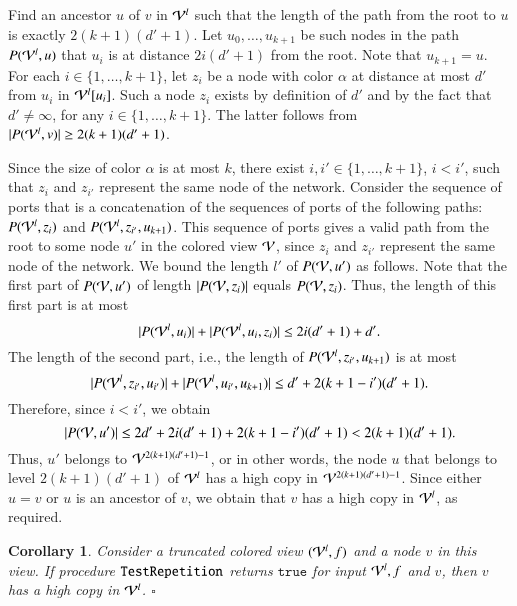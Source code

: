 \documentclass[a4paper,10pt]{article}
\newtheorem{corollary}{Corollary}[section]
\newcommand{\view}[1][]{\if!#1!\mathcal{V}\else\mathcal{V}^{#1}\fi}
\newcommand{\viewPath}[3][]{\if!#1! P(#2,#3)\else P(#2,#1,#3)\fi}  \newcommand{\ourColor}{\alpha}
\newcommand{\card}[1]{|#1|}
\newcommand{\algorithmTest}{\textup{\texttt{TestRepetition}}}
\newcommand{\returnTrue}{\texttt{true}}
\newcommand{\qed}{\hfill $\square$ \smallbreak}
\newenvironment{proof}[1][Proof]
{\par\noindent{\bf #1:} }{\hspace*{\fill}\nolinebreak{$\Box$}\bigskip\par}
\begin{document}
\begin{proof}
Find an ancestor $u$ of $v$ in $\view[l]$ such that the length of the path from the root to $u$ is exactly $2(k+1)(d'+1)$.
Let $u_0,\ldots,u_{k+1}$ be such nodes in the path $\viewPath{\view[l]}{u}$ that $u_i$ is at distance $2i(d'+1)$ from the root.
Note that $u_{k+1}=u$.
For each $i\in\{1,\ldots,k+1\}$, let $z_i$ be a node with color $\ourColor$ at distance at most $d'$ from $u_i$ in $\view[l][u_i]$.
Such a node $z_i$ exists by definition of $d'$ and by the fact that $d'\neq\infty$, {for any} $i\in\{1,\ldots,k+1\}$.
The latter follows from $\card{\viewPath{\view[l]}{v}} \geq 2(k+1)(d'+1)$.

Since the size of color $\ourColor$ is at most $k$, there exist $i,i'\in\{1,\ldots,k+1\}$, $i<i'$, such that $z_i$ and $z_{i'}$ represent the same node of the network.
Consider the sequence of ports that is a concatenation of the sequences of ports of the following paths: $\viewPath{\view[l]}{z_i}$ and $\viewPath[z_{i'}]{\view[l]}{u_{k+1}}$.
This sequence of ports gives a valid path from the root to some node $u'$ in the colored view $\view$, since $z_i$ and $z_{i'}$ represent the same node of the network.
We bound the length $l'$ of $\viewPath{\view}{u'}$ as follows.
Note that the first part of $\viewPath{\view}{u'}$ of length $|\viewPath{\view}{z_i}|$ equals $\viewPath{\view}{z_i}$.
Thus, the length of this first part is at most
\[|\viewPath{\view[l]}{u_i}|+|\viewPath[u_i]{\view[l]}{z_i}| \leq 2i(d'+1) + d'.\]
The length of the second part, i.e., the length of $\viewPath[z_{i'}]{\view[l]}{u_{k+1}}$ is {at most}
\[|\viewPath[z_{i'}]{\view[l]}{u_{i'}}|+|\viewPath[u_{i'}]{\view[l]}{u_{k+1}}| \leq d' + 2(k+1-i')(d'+1).\]
Therefore, since $i<i'$, we obtain
\[|\viewPath{\view}{u'}|\leq 2d'+2i(d'+1)+2(k+1-i')(d'+1)<2(k+1)(d'+1).\]
Thus, $u'$ belongs to $\view[2(k+1)(d'+1)-1]$, or in other words, the node $u$ that belongs to level $2(k+1)(d'+1)$ of $\view[l]$ has a high copy in $\view[2(k+1)(d'+1)-1]$.
Since either $u=v$ or $u$ is an ancestor of $v$, we obtain that $v$ has a high copy in $\view[l]$, as required.
\end{proof}

\begin{corollary} \label{cor:test:bound}
Consider a truncated colored view $(\view[l],f)$ and a node $v$ in this view.
If procedure $\algorithmTest$ returns $\returnTrue$ for input $\view[l],f$ and $v$, then $v$ has a high copy in $\view[l]$.
\qed
\end{corollary}
\end{document}
